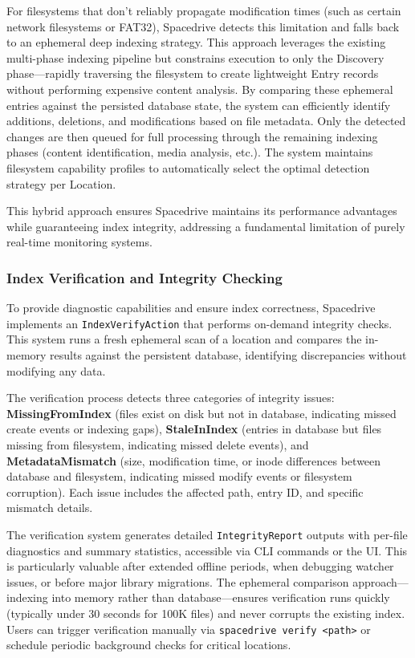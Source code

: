 \documentclass[sigconf]{acmart}
\begin{document}
For filesystems that don't reliably propagate modification times (such as certain network filesystems or FAT32), Spacedrive detects this limitation and falls back to an ephemeral deep indexing strategy. This approach leverages the existing multi-phase indexing pipeline but constrains execution to only the Discovery phase---rapidly traversing the filesystem to create lightweight Entry records without performing expensive content analysis. By comparing these ephemeral entries against the persisted database state, the system can efficiently identify additions, deletions, and modifications based on file metadata. Only the detected changes are then queued for full processing through the remaining indexing phases (content identification, media analysis, etc.). The system maintains filesystem capability profiles to automatically select the optimal detection strategy per Location.

This hybrid approach ensures Spacedrive maintains its performance advantages while guaranteeing index integrity, addressing a fundamental limitation of purely real-time monitoring systems.

\subsubsection{Index Verification and Integrity Checking}

To provide diagnostic capabilities and ensure index correctness, Spacedrive implements an \texttt{IndexVerifyAction} that performs on-demand integrity checks. This system runs a fresh ephemeral scan of a location and compares the in-memory results against the persistent database, identifying discrepancies without modifying any data.

The verification process detects three categories of integrity issues: \textbf{MissingFromIndex} (files exist on disk but not in database, indicating missed create events or indexing gaps), \textbf{StaleInIndex} (entries in database but files missing from filesystem, indicating missed delete events), and \textbf{MetadataMismatch} (size, modification time, or inode differences between database and filesystem, indicating missed modify events or filesystem corruption). Each issue includes the affected path, entry ID, and specific mismatch details.

The verification system generates detailed \texttt{IntegrityReport} outputs with per-file diagnostics and summary statistics, accessible via CLI commands or the UI. This is particularly valuable after extended offline periods, when debugging watcher issues, or before major library migrations. The ephemeral comparison approach---indexing into memory rather than database---ensures verification runs quickly (typically under 30 seconds for 100K files) and never corrupts the existing index. Users can trigger verification manually via \texttt{spacedrive verify <path>} or schedule periodic background checks for critical locations.
\end{document}
